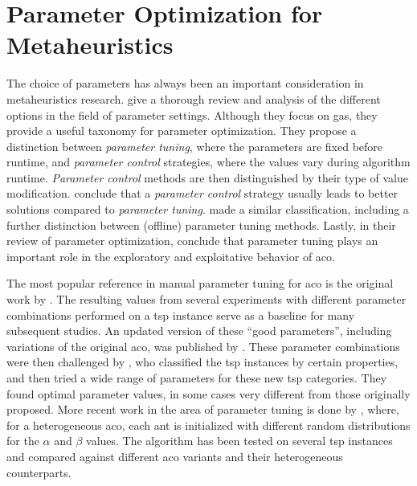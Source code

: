 \section{Parameter Optimization for Metaheuristics}
\label{chap:paramopt}

The choice of parameters has always been an important consideration in metaheuristics research. \citet{eiben1999parameter} give a thorough review and analysis of the different options in the field of parameter settings. Although they focus on \glspl{ga}, they provide a useful taxonomy for parameter optimization. They propose a distinction between \textit{parameter tuning}, where the parameters are fixed before runtime, and \textit{parameter control} strategies, where the values vary during algorithm runtime. \textit{Parameter control} methods are then distinguished by their type of value modification. \citeauthor{eiben1999parameter} conclude that a \textit{parameter control} strategy usually leads to better solutions compared to \textit{parameter tuning}. \citet{talbi2009metaheuristics} made a similar classification, including a further distinction between (offline) parameter tuning methods.
Lastly, in their review of parameter optimization, \citet{wong2008parameter} conclude that parameter tuning plays an important role in the exploratory and exploitative behavior of \gls{aco}.

The most popular reference in manual parameter tuning for \gls{aco} is the original work by \citeauthor{dorigo1991ant}  \cite{dorigo1991ant,dorigo1996ant}. The resulting values from several experiments with different parameter combinations performed on a \gls{tsp} instance serve as a baseline for many subsequent studies. An updated version of these \enquote{good parameters}, including variations of the original \gls{aco}, was published by \citet{dorigo2004ant}.
These parameter combinations were then challenged by \citet{gaertner2005optimal}, who classified the \gls{tsp} instances by certain properties, and then tried a wide range of parameters for these new \gls{tsp} categories. They found optimal parameter values, in some cases very different from those originally proposed.
More recent work in the area of parameter tuning is done by \citet{tuani2018h}, where, for a heterogeneous \gls{aco}, each ant is initialized with different random distributions for the $\alpha$ and $\beta$ values. The algorithm has been tested on several \gls{tsp} instances and compared against different \gls{aco} variants and their heterogeneous counterparts.

